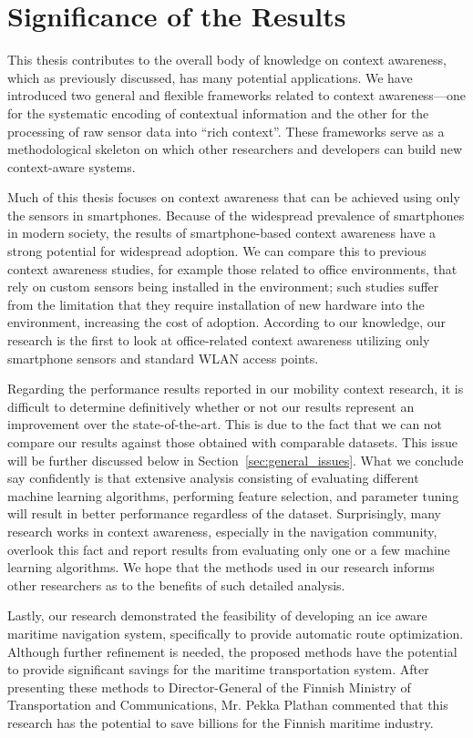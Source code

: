 \section{Significance of the Results}
\label{sec:significance}

This thesis contributes to the overall body of knowledge on context awareness, which as previously discussed, has many potential applications. We have introduced two general and flexible frameworks related to context awareness---one for the systematic encoding of contextual information and the other for the processing of raw sensor data into ``rich context''. These frameworks serve as a methodological skeleton on which other researchers and developers can build new context-aware systems.

Much of this thesis focuses on context awareness that can be achieved using only the sensors in smartphones. Because of the widespread prevalence of smartphones in modern society, the results of smartphone-based context awareness have a strong potential for widespread adoption. We can compare this to previous context awareness studies, for example those related to office environments, that rely on custom sensors being installed in the environment; such studies suffer from the limitation that they require installation of new hardware into the environment, increasing the cost of adoption. According to our knowledge, our research is the first to look at office-related context awareness utilizing only smartphone sensors and standard WLAN access points.

Regarding the performance results reported in our mobility context research, it is difficult to determine definitively whether or not our results represent an improvement over the state-of-the-art. This is due to the fact that we can not compare our results against those obtained with comparable datasets. This issue will be further discussed below in Section~\ref{sec:general_issues}. What we conclude say confidently is that extensive analysis consisting of evaluating different machine learning algorithms, performing feature selection, and parameter tuning will result in better performance regardless of the dataset. Surprisingly, many research works in context awareness, especially in the navigation community, overlook this fact and report results from evaluating only one or a few machine learning algorithms. We hope that the methods used in our research informs other researchers as to the benefits of such detailed analysis.

Lastly, our research demonstrated the feasibility of developing an ice aware maritime navigation system, specifically to provide automatic route optimization. Although further refinement is needed, the proposed methods have the potential to provide significant savings for the maritime transportation system. After presenting these methods to Director-General of the Finnish Ministry of Transportation and Communications, Mr. Pekka Plathan commented that this research has the potential to save billions for the Finnish maritime industry.

